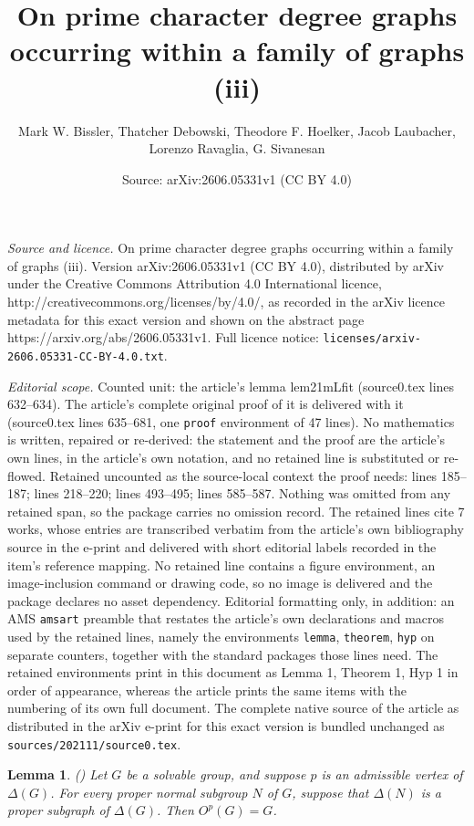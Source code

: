 \documentclass[10pt,a4paper]{amsart}
\title{On prime character degree graphs occurring within a family of graphs (iii)}
\author{Mark W. Bissler, Thatcher Debowski, Theodore F. Hoelker, Jacob Laubacher, Lorenzo Ravaglia, G. Sivanesan}
\date{Source: arXiv:2606.05331v1 (CC BY 4.0)}
\newtheorem{lemma}{Lemma}
\begin{document}
\maketitle

\noindent\emph{Source and licence.} On prime character degree graphs occurring within a family of graphs (iii). Version arXiv:2606.05331v1 (CC BY 4.0), distributed by arXiv under the Creative Commons Attribution 4.0 International licence, http://creativecommons.org/licenses/by/4.0/, as recorded in the arXiv licence metadata for this exact version and shown on the abstract page https://arxiv.org/abs/2606.05331v1. Full licence notice: \texttt{licenses/arxiv-2606.05331-CC-BY-4.0.txt}.\par\smallskip

\noindent\textit{Editorial scope.} Counted unit: the article's lemma lem21mLfit (source0.tex lines 632--634). The article's complete original proof of it is delivered with it (source0.tex lines 635--681, one \texttt{proof} environment of 47 lines). No mathematics is written, repaired or re-derived: the statement and the proof are the article's own lines, in the article's own notation, and no retained line is substituted or re-flowed.  Retained uncounted as the source-local context the proof needs: lines 185--187; lines 218--220; lines 493--495; lines 585--587.  Nothing was omitted from any retained span, so the package carries no omission record.  The retained lines cite 7 works, whose entries are transcribed verbatim from the article's own bibliography source in the e-print and delivered with short editorial labels recorded in the item's reference mapping.  No retained line contains a figure environment, an image-inclusion command or drawing code, so no image is delivered and the package declares no asset dependency.  Editorial formatting only, in addition: an AMS \texttt{amsart} preamble that restates the article's own declarations and macros used by the retained lines, namely the environments \texttt{lemma}, \texttt{theorem}, \texttt{hyp} on separate counters, together with the standard packages those lines need.  The retained environments print in this document as Lemma 1, Theorem 1, Hyp 1 in order of appearance, whereas the article prints the same items with the numbering of its own full document.  The complete native source of the article as distributed in the arXiv e-print for this exact version is bundled unchanged as \texttt{sources/202111/source0.tex}.
\begin{lemma}\label{bigoh}\emph{(\cite{BLL2})}
Let $G$ be a solvable group, and suppose $p$ is an admissible vertex of $\Delta(G)$. For every proper normal subgroup $N$ of $G$, suppose that $\Delta(N)$ is a proper subgraph of $\Delta(G)$. Then $O^p(G)=G$.
\end{lemma}
\end{document}
